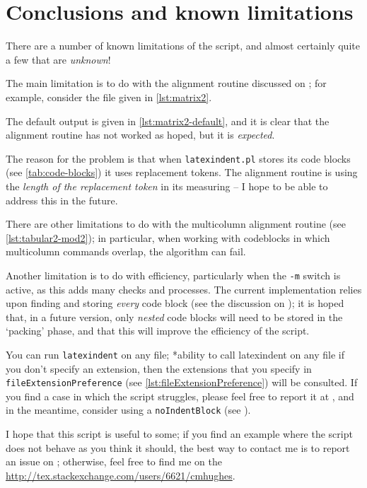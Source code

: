 \section{Conclusions and known limitations}\label{sec:knownlimitations}
 There are a number of known limitations of the script, and almost certainly quite a few
 that are \emph{unknown}!

 The main limitation is to do with the alignment routine discussed on
 ; for example, consider the file given in \cref{lst:matrix2}.


 The default output is given in \cref{lst:matrix2-default}, and it is clear that the alignment
 routine has not worked as hoped, but it is \emph{expected}. 

 The reason for the problem is that when \texttt{latexindent.pl} stores its code blocks
 (see \vref{tab:code-blocks}) it uses replacement tokens. The alignment routine is using
 the \emph{length of the replacement token} in its measuring -- I hope to be able to address this in the
 future.

 There are other limitations to do with the multicolumn alignment routine (see
 \vref{lst:tabular2-mod2}); in particular, when working with codeblocks in which multicolumn
 commands overlap, the algorithm can fail.

 Another limitation is to do with efficiency, particularly when the \texttt{-m}
 switch is active, as this adds many checks and processes. The current implementation
 relies upon finding and storing \emph{every} code block (see the discussion on
 ); it is hoped that, in a future version, only
 \emph{nested} code blocks will need to be stored in the `packing' phase, and
 that this will improve the efficiency of the script.

 You can run \texttt{latexindent} on any file; *{ability to call latexindent on any file} if you 
 don't specify an extension, then the extensions that you specify in \lstinline[breaklines=true]!fileExtensionPreference! (see \vref{lst:fileExtensionPreference}) 
 will be consulted. If you find a case in which the script struggles, please feel free to report it at
 \cite{latexindent-home}, and in the meantime, consider using a \texttt{noIndentBlock} (see ).

 I hope that this script is useful to some; if you find an example where the script does
 not behave as you think it should, the best way to contact me is to report an issue on
 \cite{latexindent-home}; otherwise, feel free to find me on the \url{http://tex.stackexchange.com/users/6621/cmhughes}.
